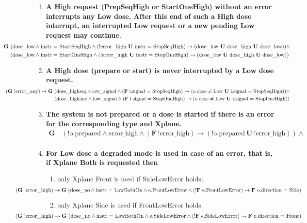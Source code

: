\documentclass[a4paper,10pt]{article}
\newcommand{\LTLG}{\mathbf{G~}}
\newcommand{\LTLF}{\mathbf{F~}}
\newcommand{\LTLU}{\mathbf{~U~}}
\newcommand{\imply}{\rightarrow}
\newcommand{\doselow}{\textrm{dose\_low}}
\newcommand{\doseno}{\textrm{dose\_no}}
\newcommand{\dosehigh}{\textrm{dose\_high}}
\newcommand{\dosehighseq}{\textrm{dose\_highseq}}
\newcommand{\dosehighone}{\textrm{dose\_highone}}
\newcommand{\lowsignal}{\textrm{low\_signal}}
\newcommand{\errorany}{\textrm{error\_any}}
\newcommand{\errorhigh}{\textrm{error\_high}}
\begin{document}
\begin{enumerate}
		\item \textbf{A High request (PrepSeqHigh or StartOneHigh) without an error interrupts any Low dose. After this end of such a High dose interrupt, an interrupted Low request or a new pending Low request may continue.}
			\begin{align*}
				\hspace{-8em}\LTLG & (\doselow \land \textrm{instr = StartSeqHigh} \land (!\errorhigh \LTLU \textrm{instr = StopSeqHigh}) \imply (\doselow \LTLU \dosehigh \LTLU \doselow)) \land \\
				\hspace{-8em}	&(\doselow \land \textrm{instr = StartOneHigh} \land (!\errorhigh \LTLU \textrm{instr = StopOneHigh}) \imply (\doselow \LTLU \dosehigh \LTLU \doselow))
			\end{align*}

		\item \textbf{A High dose (prepare or start) is never interrupted by a Low dose request.}
			\begin{align*}
				\hspace{-8em}(\LTLG !\errorany) \imply \LTLG & (\dosehighseq \land \lowsignal \land (\LTLF \textrm{i.signal = StopSeqHigh}) \imply (\textrm{o.dose} \neq \textrm{Low} \LTLU \textrm{i.signal = StopSeqHigh})) \land \\
				\hspace{-8em}	& (\dosehighone \land \lowsignal \land (\LTLF \textrm{i.signal = StopOneHigh}) \imply (\textrm{o.dose} \neq \textrm{Low} \LTLU \textrm{i.signal = StopOneHigh}))
			\end{align*}
	
		\item \textbf{The system is not prepared or a dose is started if there is an error for the corresponding type and Xplane.}
			\begin{align*}
				\LTLG &(!\textrm{o.prepared} \land \errorhigh \land (\LTLF !\errorhigh) \imply (!\textrm{o.prepared} \LTLU !\errorhigh)) \land \\
						& %
			\end{align*}

		\item \textbf{For Low dose a degraded mode is used in case of an error, that is, if Xplane Both is requested then}
			\begin{enumerate}
				\item only Xplane Front is used if SideLowError holds;
					\[
					\hspace{-8em}	(\LTLG !\errorhigh) \imply \LTLG (\doseno \land \textrm{instr = LowBothOn} \land \textrm{e.FrontLowError} \land (!\LTLF \textrm{e.FrontLowError}) \imply \LTLF \textrm{o.direction = Side})
					\]
				\item only Xplane Side is used if FrontLowError holds.
					\[
					\hspace{-8em}	(\LTLG !\errorhigh) \imply \LTLG (\doseno \land \textrm{instr = LowBothOn} \land \textrm{e.SideLowError} \land (!\LTLF \textrm{e.SideLowError}) \imply \LTLF \textrm{o.direction = Front})
					\]
			\end{enumerate}


\end{enumerate}
\end{document}
